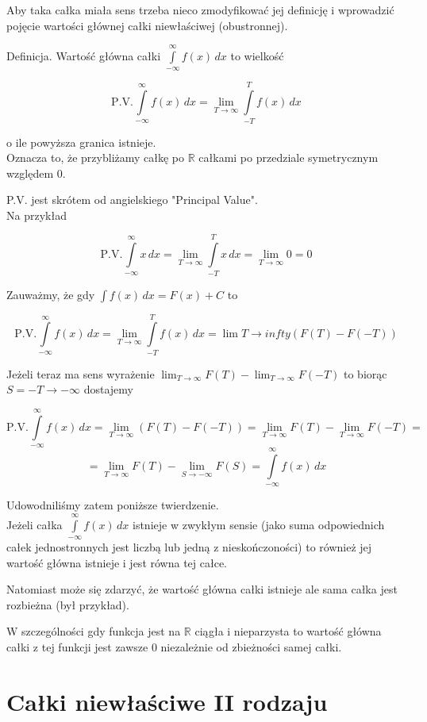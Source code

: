 \documentclass[12pt]{article}
\begin{document}
Aby taka całka miała sens trzeba nieco zmodyfikować jej definicję i wprowadzić pojęcie wartości głównej całki niewłaściwej (obustronnej).

Definicja. Wartość główna całki $ \int\limits_{-\infty}^{\infty} f(x) \,dx $ to wielkość

$$ \textrm{P.V.} \int\limits_{-\infty}^{\infty} f(x) \,dx = \lim_{T \to \infty} \int\limits_{-T}^{T} f(x) \,dx $$

o ile powyższa granica istnieje. \\

Oznacza to, że przybliżamy całkę po $\mathbb{R}$ całkami po przedziale symetrycznym względem 0.

P.V. jest skrótem od angielskiego "Principal Value". \\

Na przykład 

$$ \textrm{P.V.} \int\limits_{-\infty}^{\infty} x \,dx = \lim_{T \to \infty} \int\limits_{-T}^{T} x\,dx
= \lim_{T \to \infty} 0 = 0 $$

Zauważmy, że gdy $ \int f(x) \,dx = F(x) + C $ to

$$ \textrm{P.V.} \int\limits_{-\infty}^{\infty} f(x) \,dx = \lim_{T \to \infty} \int\limits_{-T}^{T} f(x) \,dx
= \lim{T \to infty} (F(T) - F(-T)) $$

Jeżeli teraz ma sens wyrażenie $ \lim_{T \to \infty} F(T ) - \lim_{T \to \infty} F(-T) $ to biorąc $ S = -T \to -\infty $ dostajemy

$$ \textrm{P.V.} \int\limits_{-\infty}^{\infty} f(x) \,dx = \lim_{T \to \infty} (F(T) - F(-T)) = 
\lim_{T \to \infty} F(T) - \lim_{T \to \infty} F(-T) = $$ $$ =  \lim_{T \to \infty} F(T) - \lim_{S \to -\infty} F(S)
= \int\limits_{-\infty}^{\infty} f(x) \,dx $$

Udowodniliśmy zatem poniższe twierdzenie. \\

Jeżeli całka $ \int\limits_{-\infty}^{\infty} f(x) \,dx $ istnieje w zwykłym sensie (jako suma odpowiednich całek jednostronnych
jest liczbą lub jedną z nieskończoności) to również jej wartość główna istnieje i jest równa tej całce.

Natomiast może się zdarzyć, że wartość główna całki istnieje ale sama całka jest rozbieżna (był przykład).

W szczególności gdy funkcja jest na $\mathbb{R}$ ciągła i nieparzysta to wartość główna całki z tej funkcji jest zawsze
0 niezależnie od zbieżności samej całki.

\section{Całki niewłaściwe II rodzaju}
\end{document}
